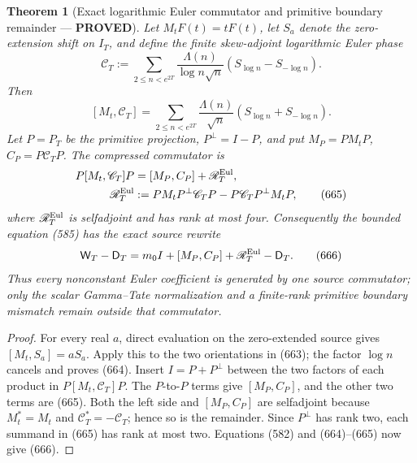 \documentclass[11pt]{article}
\newtheorem{theorem}{Theorem}
\newcommand{\PROVED}{\textcolor{green!45!black}{\textbf{PROVED}}}
\begin{document}
\begin{theorem}[Exact logarithmic Euler commutator and primitive boundary
remainder --- \PROVED]
Let \(M_tF(t)=tF(t)\), let \(S_a\) denote the zero-extension shift on
\(I_T\), and define the finite skew-adjoint logarithmic Euler phase
\begin{equation}
 \mathscr C_T:=
 \sum_{2\le n<e^{2T}}
 \frac{\Lambda(n)}{\log n\sqrt n}
       (S_{\log n}-S_{-\log n}).                    \tag{663}
\end{equation}
Then
\begin{equation}
 \boxed{[M_t,\mathscr C_T]=
 \sum_{2\le n<e^{2T}}
 \frac{\Lambda(n)}{\sqrt n}
       (S_{\log n}+S_{-\log n}).}                  \tag{664}
\end{equation}
Let \(P=P_T\) be the primitive projection, \(P^\perp=I-P\), and put
\(M_P=PM_tP\), \(C_P=P\mathscr C_TP\).  The compressed commutator is
\begin{align}
 P[M_t,\mathscr C_T]P
 &=[M_P,C_P]+\mathscr R_T^{\rm Eul},\notag\\
 \mathscr R_T^{\rm Eul}
 &:=PM_tP^\perp\mathscr C_TP
    -P\mathscr C_TP^\perp M_tP,                    \tag{665}
\end{align}
where \(\mathscr R_T^{\rm Eul}\) is selfadjoint and has rank at most four.
Consequently the bounded equation (585) has the exact source rewrite
\begin{equation}
 \mathsf W_T-\mathsf D_T
 =m_0I+[M_P,C_P]+\mathscr R_T^{\rm Eul}-\mathsf D_T.\tag{666}
\end{equation}
Thus every nonconstant Euler coefficient is generated by one source
commutator; only the scalar Gamma--Tate normalization and a finite-rank
primitive boundary mismatch remain outside that commutator.
\end{theorem}

\begin{proof}
For every real \(a\), direct evaluation on the zero-extended source gives
\([M_t,S_a]=aS_a\).  Apply this to the two orientations in (663); the
factor \(\log n\) cancels and proves (664).  Insert \(I=P+P^\perp\) between
the two factors of each product in \(P[M_t,\mathscr C_T]P\).  The
\(P\)-to-\(P\) terms give \([M_P,C_P]\), and the other two terms are
(665).  Both the left side and \([M_P,C_P]\) are selfadjoint because
\(M_t^*=M_t\) and \(\mathscr C_T^*=-\mathscr C_T\); hence so is the
remainder.  Since \(P^\perp\) has rank two, each summand in (665) has rank
at most two.  Equations (582) and (664)--(665) now give (666).
\end{proof}
\end{document}
